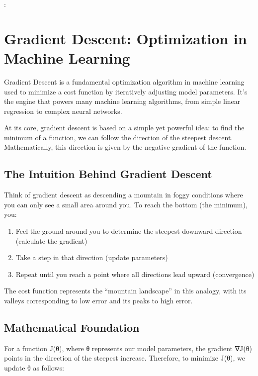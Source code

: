 \documentclass[
  letterpaper,
  DIV=11,
  numbers=noendperiod]{scrreprt}
\providecommand{\tightlist}{%
  \setlength{\itemsep}{0pt}\setlength{\parskip}{0pt}}\usepackage{longtable,booktabs,array}
\begin{document}
:


\chapter{Gradient Descent: Optimization in Machine
Learning}\label{gradient-descent-optimization-in-machine-learning}

Gradient Descent is a fundamental optimization algorithm in machine
learning used to minimize a cost function by iteratively adjusting model
parameters. It's the engine that powers many machine learning
algorithms, from simple linear regression to complex neural networks.

At its core, gradient descent is based on a simple yet powerful idea: to
find the minimum of a function, we can follow the direction of the
steepest descent. Mathematically, this direction is given by the
negative gradient of the function.

\section{The Intuition Behind Gradient
Descent}\label{the-intuition-behind-gradient-descent}

Think of gradient descent as descending a mountain in foggy conditions
where you can only see a small area around you. To reach the bottom (the
minimum), you:

\begin{enumerate}
\def\labelenumi{\arabic{enumi}.}
\tightlist
\item
  Feel the ground around you to determine the steepest downward
  direction (calculate the gradient)
\item
  Take a step in that direction (update parameters)
\item
  Repeat until you reach a point where all directions lead upward
  (convergence)
\end{enumerate}

The cost function represents the ``mountain landscape'' in this analogy,
with its valleys corresponding to low error and its peaks to high error.

\section{Mathematical Foundation}\label{mathematical-foundation-1}

For a function J(θ), where θ represents our model parameters, the
gradient ∇J(θ) points in the direction of the steepest increase.
Therefore, to minimize J(θ), we update θ as follows:
\end{document}
